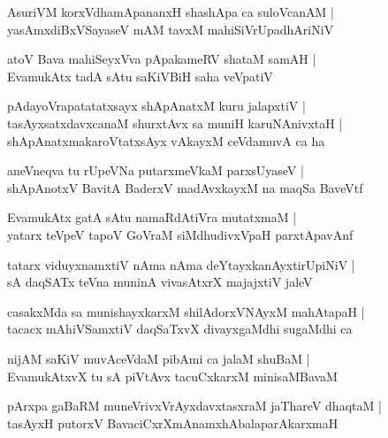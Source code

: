 \begin{shloka}
AsuriVM korxVdhamApananxH shashApa ca suloVcanAM |\\
yasAmxdiBxVSayaseV mAM tavxM mahiSiVrUpadhAriNiV 
\end{shloka}

\begin{shloka}
atoV Bava mahiSeyxVva pApakameRV shataM samAH |\\
EvamukAtx tadA sAtu saKiVBiH saha veVpatiV 
\end{shloka}

\begin{shloka}
pAdayoVrapatatatxsayx shApAnatxM kuru jalapxtiV |\\
tasAyxsatxdavxcanaM shurxtAvx sa muniH karuNAnivxtaH |\\
shApAnatxmakaroVtatxsAyx vAkayxM ceVdamuvA ca ha
\end{shloka}

\begin{shloka}
aneVneqva tu rUpeVNa putarxmeVkaM parxsUyaseV |\\
shApAnotxV BavitA BaderxV madAvxkayxM na maqSa BaveVtf 
\end{shloka}

\begin{shloka}
EvamukAtx gatA sAtu namaRdAtiVra mutatxmaM |\\
yatarx teVpeV tapoV GoVraM siMdhudivxVpaH parxtApavAnf 
\end{shloka}

\begin{shloka}
tatarx viduyxnamxtiV nAma nAma deYtayxkanAyxtirUpiNiV |\\
sA daqSATx teVna muninA vivasAtxrX majajxtiV jaleV 
\end{shloka}

\begin{shloka}
casakxMda sa munishayxkarxM shilAdorxVNAyxM mahAtapaH |\\
tacacx mAhiVSamxtiV daqSaTxvX divayxgaMdhi sugaMdhi ca
\end{shloka}

\begin{shloka}
nijAM saKiV muvAceVdaM pibAmi ca jalaM shuBaM |\\
EvamukAtxvX tu sA piVtAvx tacuCxkarxM minisaMBavaM 
\end{shloka}

\begin{shloka}
pArxpa gaBaRM muneVrivxVrAyxdavxtasxraM jaThareV dhaqtaM |\\
tasAyxH putorxV BavaciCxrXmAnamxhAbalaparAkarxmaH
\end{shloka}

